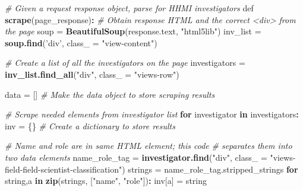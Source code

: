 \documentclass[]{krantz}
\newenvironment{Shaded}{\begin{snugshade}}{\end{snugshade}}
\newcommand{\KeywordTok}[1]{\textcolor[rgb]{0.13,0.29,0.53}{\textbf{#1}}}
\newcommand{\DataTypeTok}[1]{\textcolor[rgb]{0.13,0.29,0.53}{#1}}
\newcommand{\StringTok}[1]{\textcolor[rgb]{0.31,0.60,0.02}{#1}}
\newcommand{\CommentTok}[1]{\textcolor[rgb]{0.56,0.35,0.01}{\textit{#1}}}
\newcommand{\ControlFlowTok}[1]{\textcolor[rgb]{0.13,0.29,0.53}{\textbf{#1}}}
\newcommand{\OperatorTok}[1]{\textcolor[rgb]{0.81,0.36,0.00}{\textbf{#1}}}
\newcommand{\NormalTok}[1]{#1}
\begin{document}
\begin{Shaded}
\begin{Highlighting}[]
\CommentTok{# Given a request response object, parse for HHMI investigators}
\NormalTok{def }\KeywordTok{scrape}\NormalTok{(page_response)}\OperatorTok{:}
\StringTok{   }\CommentTok{# Obtain response HTML and the correct <div> from the page}
\StringTok{   }\NormalTok{soup =}\StringTok{ }\KeywordTok{BeautifulSoup}\NormalTok{(response.text, }\StringTok{"html5lib"}\NormalTok{)}
\NormalTok{   inv_list =}\StringTok{ }\KeywordTok{soup.find}\NormalTok{(}\StringTok{'div'}\NormalTok{, }\DataTypeTok{class_ =} \StringTok{"view-content"}\NormalTok{)}

   \CommentTok{# Create a list of all the investigators on the page}
\NormalTok{   investigators =}\StringTok{ }\KeywordTok{inv_list.find_all}\NormalTok{(}\StringTok{"div"}\NormalTok{, }\DataTypeTok{class_ =} \StringTok{"views-row"}\NormalTok{)}

\NormalTok{   data =}\StringTok{ }\NormalTok{[] }\CommentTok{# Make the data object to store scraping results}

   \CommentTok{# Scrape needed elements from investigator list}
   \ControlFlowTok{for}\NormalTok{ investigator }\ControlFlowTok{in}\NormalTok{ investigators}\OperatorTok{:}
\StringTok{       }\NormalTok{inv =}\StringTok{ }\NormalTok{\{\} }\CommentTok{# Create a dictionary to store results}

       \CommentTok{# Name and role are in same HTML element; this code}
       \CommentTok{# separates them into two data elements}
\NormalTok{       name_role_tag =}\StringTok{ }\KeywordTok{investigator.find}\NormalTok{(}\StringTok{"div"}\NormalTok{,}
           \DataTypeTok{class_ =} \StringTok{"views-field-field-scientist-classification"}\NormalTok{)}
\NormalTok{       strings =}\StringTok{ }\NormalTok{name_role_tag.stripped_strings}
       \ControlFlowTok{for}\NormalTok{ string,a }\ControlFlowTok{in} \KeywordTok{zip}\NormalTok{(strings, [}\StringTok{"name"}\NormalTok{, }\StringTok{"role"}\NormalTok{])}\OperatorTok{:}
\StringTok{           }\NormalTok{inv[a] =}\StringTok{ }\NormalTok{string}


\end{Highlighting}
\end{Shaded}
\end{document}
